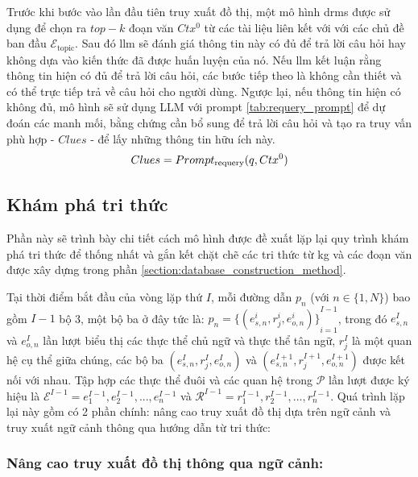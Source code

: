 Trước khi bước vào lần đầu tiên truy xuất đồ thị, một mô hình \gls{drms} được sử dụng để chọn ra $top-k$ đoạn văn $Ctx^0$ từ các tài liệu liên kết với với các chủ đề ban đầu $\mathcal{E}_{\text{topic}}$. Sau đó \gls{llm} sẽ đánh giá thông tin này có đủ để trả lời câu hỏi hay không dựa vào kiến thức đã được huấn luyện của nó. Nếu \gls{llm} kết luận rằng thông tin hiện có đủ để trả lời câu hỏi, các bước tiếp theo là không cần thiết và có thể trực tiếp trả về câu hỏi cho người dùng. Ngược lại, nếu thông tin hiện có không đủ, mô hình sẽ sử dụng LLM với prompt \ref{tab:requery_prompt}  để dự đoán các manh mối, bằng chứng cần bổ sung để trả lời câu hỏi và tạo ra truy vấn phù hợp - $Clues$ - để lấy những thông tin hữu ích này.
\begin{equation}
    \centering
    Clues = Prompt_{\text{requery}}(q, Ctx^0)
    \label{eq:requery_prompt}
\end{equation}


\subsection{Khám phá tri thức}
\label{subsection:knowledge_exploration}
Phần này sẽ trình bày chi tiết cách mô hình được đề xuất lặp lại quy trình khám phá tri thức để thống nhất và gắn kết chặt chẽ các tri thức từ \gls{kg} và các đoạn văn được xây dựng trong phần \ref{section:database_construction_method}.


Tại thời điểm bắt đầu của vòng lặp thứ $I$, mỗi đường dẫn $p_n$ (với $n \in \{1, N\}$) bao gồm $I - 1$ bộ 3, một bộ ba ở đây tức là: $p_n = {\{(e_{s,n}^i, r_j^i, e_{o,n}^i)\}}_{i=1}^{I-1}$, trong đó $e_{s,n}^I$ và $e_{o,n}^I$ lần lượt biểu thị các thực thể chủ ngữ và thực thể tân ngữ, $r_j^I$ là một quan hệ cụ thể giữa chúng, các bộ ba $(e_{s,n}^I, r_j^I, e_{o,n}^I)$ và $(e_{s,n}^{I+1}, r_j^{I+1}, e_{o,n}^{I+1})$ được kết nối với nhau. Tập hợp các thực thể đuôi và các quan hệ trong $\mathcal{P}$ lần lượt được ký hiệu là $\mathcal{E}^{I-1} = {e_1^{I-1}, e_2^{I-1}, ..., e_n^{I-1}}$ và $\mathcal{R}^{I-1} = {r_1^{I-1}, r_2^{I-1}, ..., r_n^{I-1}}$. Quá trình lặp lại này gồm có 2 phần chính: nâng cao truy xuất đồ thị dựa trên ngữ cảnh và truy xuất ngữ cảnh thông qua hướng dẫn từ tri thức:


\subsubsection{Nâng cao truy xuất đồ thị thông qua ngữ cảnh:}
\label{subsubsection:graph_expansion}


